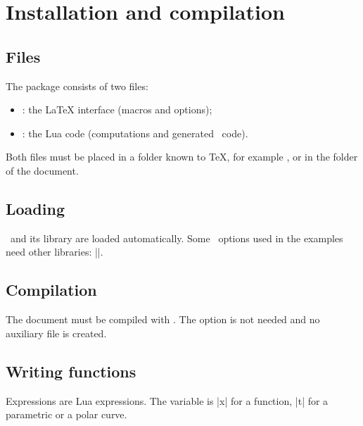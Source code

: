 \section{Installation and compilation}

\subsection{Files}

The package consists of two files:
\begin{itemize}
  \item {}: the \LaTeX{} interface (macros and options);
  \item {}: the Lua code (computations and generated \TIKZ\ code).
\end{itemize}

Both files must be placed in a folder known to \TeX{}, for example , or in the folder of the document.

\subsection{Loading}

\begin{tkzltxexample}[]
\usepackage{tkz-fn}         %
\usepackage[us]{tkz-fn}     %
\usepackage[fr]{tkz-fn}     %
\end{tkzltxexample}

\TIKZ\ and its library  are loaded automatically. Some \TIKZ\ options used in the examples need other libraries: |\usetikzlibrary{arrows,patterns}|.

\subsection{Compilation}

The document must be compiled with . The  option is not needed and no auxiliary file is created.

\subsection{Writing functions}

Expressions are Lua expressions. The variable is |x| for a function, |t| for a parametric or a polar curve.

